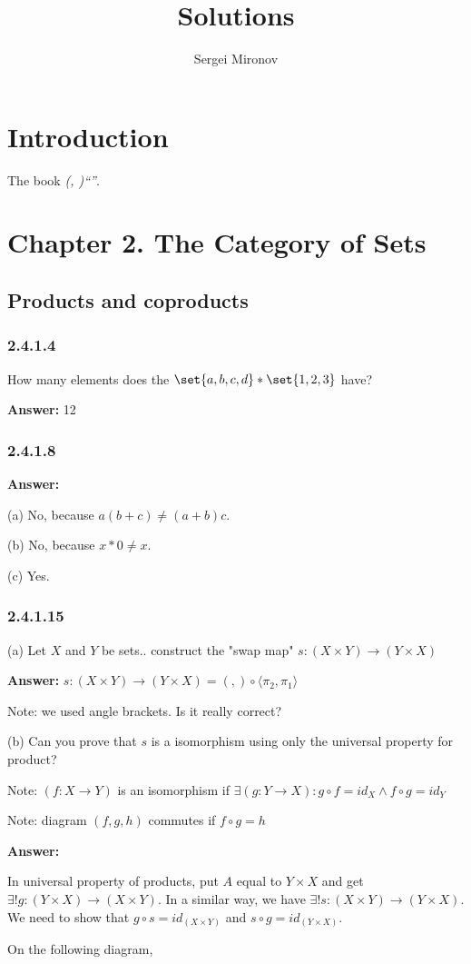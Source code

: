 \documentclass{article}
\title{Solutions}
\author{Sergei Mironov}
\newcommand{\vsp}[0]{\vspace*{10pt}\par}
\newcommand{\tcite}[1]{\textit{(\citefield{#1}{year}, \citeauthor{#1})}\:\textit{``\citefield{#1}{title}''}\:\cite{#1}}
\newcommand{\exercise}[1]{\subsubsection*{#1}}
\newcommand{\ans}[0]{\vsp\textbf{Answer: }}
\begin{document}
\maketitle

\tableofcontents

\section{Introduction}

The book \tcite{Spivak2013CategoryTF}.

\setcounter{section}{2}
\section*{Chapter 2. The Category of Sets}

\setcounter{subsection}{3}
\subsection{Products and coproducts}

\exercise{2.4.1.4}
How many elements does the $\set{a,b,c,d} * \set{1,2,3}$ have?
\ans
12

\exercise{2.4.1.8}
\ans
\vsp (a) No, because $a(b + c) \neq (a+b)c$.
\vsp (b) No, because $x*0 \neq x$.
\vsp (c) Yes.

\exercise{2.4.1.15}

(a) Let $X$ and $Y$ be sets.. construct the "swap map" $s:(X \times Y)\to(Y \times X)$
\ans
$s:(X \times Y)\to(Y \times X) = (,)\circ\langle\pi_2,\pi_1\rangle$

Note: we used angle brackets. Is it really correct?

\vsp
(b) Can you prove that $s$ is a isomorphism using only the universal property for product?

Note: $(f:X \to Y)$ is an isomorphism if $\exists (g:Y \to X): g \circ f = id_X \land f \circ g =
id_Y$

Note: diagram $(f,g,h)$ commutes if $f \circ g = h$
\ans

In universal property of products, put $A$ equal to $Y \times X$ and get $\exists !
g:(Y \times X)\to(X \times Y)$. In a similar way, we have $\exists! s:(X \times Y)\to(Y \times X)$.
We need to show that $g \circ s = id_{(X \times Y)}$ and $s \circ g = id_{(Y\times X)}$.

On the following diagram,

\end{document}
